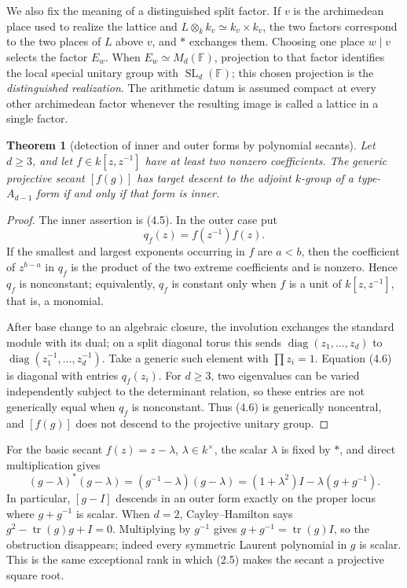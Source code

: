 \documentclass[11pt,reqno]{amsart}
\newtheorem{theorem}{Theorem}[section]
\theoremstyle{definition}
\theoremstyle{remark}
\newcommand{\F}{\mathbb F}
\newcommand{\Tr}{\operatorname{tr}}
\newcommand{\SL}{\operatorname{SL}}
\newcommand{\diag}{\operatorname{diag}}
\begin{document}
We also fix the meaning of a distinguished split factor.  If \(v\) is the
archimedean place used to realize the lattice and
\(L\otimes_k k_v\simeq k_v\times k_v\), the two factors correspond to the
two places of \(L\) above \(v\), and \(*\) exchanges them.  Choosing one
place \(w\mid v\) selects the factor \(E_w\).  When
\(E_w\simeq M_d(\F)\), projection to that factor identifies the local
special unitary group with \(\SL_d(\F)\); this chosen projection is the
\emph{distinguished realization}.  The arithmetic datum is assumed compact
at every other archimedean factor whenever the resulting image is called a
lattice in a single factor.

\begin{theorem}[detection of inner and outer forms by polynomial secants]\label{thm:secant-detector}
Let \(d\ge3\), and let \(f\in k[z,z^{-1}]\) have at least two nonzero
coefficients.  The generic
projective secant \([f(g)]\) has target descent to the adjoint \(k\)-group of
a type-\(A_{d-1}\) form if and only if that form is inner.
\end{theorem}

\begin{proof}
The inner assertion is (4.5).  In the outer case put
\[
 q_f(z)=f(z^{-1})f(z).
\]
If the smallest and largest exponents occurring in \(f\) are \(a<b\), then
the coefficient of \(z^{b-a}\) in \(q_f\) is the product of the two extreme
coefficients and is nonzero.  Hence \(q_f\) is nonconstant; equivalently,
\(q_f\) is constant only when \(f\) is a unit of \(k[z,z^{-1}]\), that is, a
monomial.

After base change to an algebraic closure, the involution exchanges the
standard module with its dual; on a split diagonal torus this sends
\(\diag(z_1,\ldots,z_d)\) to
\(\diag(z_1^{-1},\ldots,z_d^{-1})\).  Take a generic such element with
\(\prod z_i=1\).  Equation (4.6) is diagonal with
entries \(q_f(z_i)\).  For \(d\ge3\), two eigenvalues can be varied
independently subject to the determinant relation, so these entries are not
generically equal when \(q_f\) is nonconstant.  Thus (4.6) is generically
noncentral, and \([f(g)]\) does not descend to the projective unitary group.
\end{proof}

For the basic secant \(f(z)=z-\lambda\), \(\lambda\in k^\times\), the scalar
\(\lambda\) is fixed by \(*\), and direct multiplication gives
\[
 (g-\lambda)^*(g-\lambda)
 =(g^{-1}-\lambda)(g-\lambda)
 =(1+\lambda^2)I-\lambda(g+g^{-1}).
\tag{4.7}
\]
In particular, \([g-I]\) descends in an outer form exactly on the proper
locus where \(g+g^{-1}\) is scalar.  When \(d=2\), Cayley--Hamilton says
\(g^2-\Tr(g)g+I=0\).  Multiplying by \(g^{-1}\) gives
\(g+g^{-1}=\Tr(g)I\), so the obstruction disappears; indeed every symmetric
Laurent polynomial in \(g\) is scalar.  This is the same exceptional rank in
which (2.5) makes the secant a projective square root.
\end{document}
